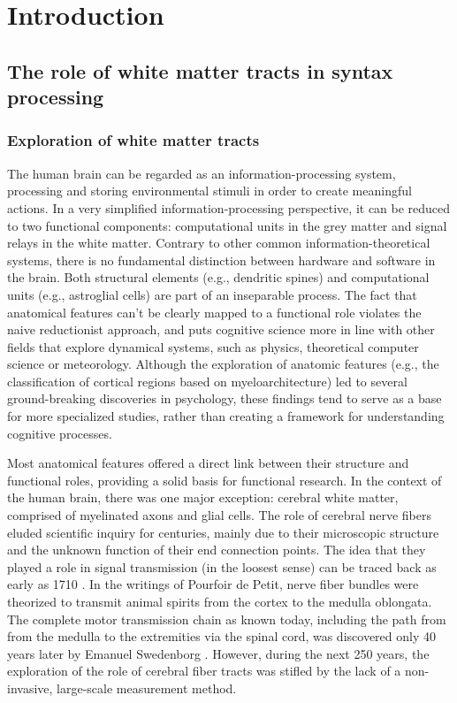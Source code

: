 
\chapter{Introduction}

\section{The role of white matter tracts in syntax processing}

\subsection{Exploration of white matter tracts}
The human brain can be regarded as an information-processing system, processing and storing environmental stimuli in order to create meaningful actions. 
In a very simplified information-processing perspective, it can be reduced to two functional components: computational units in the grey matter and signal relays in the white matter.
Contrary to other common information-theoretical systems, there is no fundamental distinction between hardware and software in the brain.
Both structural elements (e.g., dendritic spines) and computational units (e.g., astroglial cells) are part of an inseparable process.
The fact that anatomical features can't be clearly mapped to a functional role violates the naive reductionist approach, and puts cognitive science more in line with other fields that explore dynamical systems, such as physics, theoretical computer science or meteorology.
Although the exploration of anatomic features (e.g., the classification of cortical regions based on myeloarchitecture) led to several ground-breaking discoveries in psychology, these findings tend to serve as a base for more specialized studies, rather than creating a framework for understanding cognitive processes.

Most anatomical features offered a direct link between their structure and functional roles, providing a solid basis for functional research.
In the context of the human brain, there was one major exception: cerebral white matter, comprised of myelinated axons and glial cells.
The role of cerebral nerve fibers eluded scientific inquiry for centuries, mainly due to their microscopic structure and the unknown function of their end connection points.
The idea that they played a role in signal transmission (in the loosest sense) can be traced back as early as 1710 \cite{1.1.history}.
In the writings of Pourfoir de Petit, nerve fiber bundles were theorized to transmit animal spirits from the cortex to the medulla oblongata.
The complete motor transmission chain as known today, including the path from from the medulla to the extremities via the spinal cord, was discovered only 40 years later by Emanuel Swedenborg \cite{1.1.history}.
However, during the next 250 years, the exploration of the role of cerebral fiber tracts was stifled by the lack of a non-invasive, large-scale measurement method.

